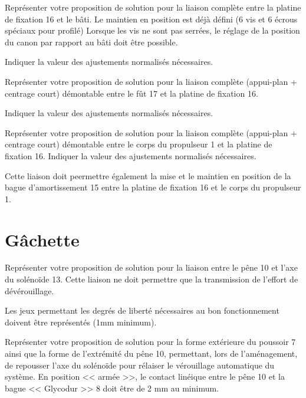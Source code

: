 \documentclass[11pt]{article}
\begin{document}
\UPSTIquestion Représenter votre proposition de solution pour la liaison complète entre la platine de fixation 16 et le bâti. Le maintien en position est déjà défini (6 vis et 6 écrous spéciaux pour profilé) Lorsque les vis ne sont pas serrées, le réglage de la position du canon par rapport au bâti doit être possible.

Indiquer la valeur des ajustements normalisés nécessaires.
\begin{UPSTIcorrige}
\end{UPSTIcorrige}

\UPSTIquestion Représenter votre proposition de solution pour la liaison complète (appui-plan + centrage court) démontable entre le fût 17 et la platine de fixation 16. 

Indiquer la valeur des ajustements normalisés nécessaires.
\begin{UPSTIcorrige}
\end{UPSTIcorrige}

\UPSTIquestion Représenter votre proposition de solution pour la liaison complète (appui-plan + centrage court) démontable entre le corps du propulseur 1 et la platine de fixation 16. Indiquer la valeur des ajustements normalisés nécessaires.

Cette liaison doit peermettre également la mise et le maintien en position de la bague d'amortissement 15 entre la platine de fixation 16 et le corps du propulseur 1. 

\begin{UPSTIcorrige}
\end{UPSTIcorrige}

\section{Gâchette}

\UPSTIquestion* Représenter votre proposition de solution pour la liaison entre le pêne 10 et l'axe du solénoïde 13. Cette liaison ne doit permettre que la transmission de l'effort de dévérouillage. 

Les jeux permettant les degrés de liberté nécessaires au bon fonctionnement doivent être représentés (1mm minimum). 
\begin{UPSTIcorrige}
\end{UPSTIcorrige}

\UPSTIquestion Représenter votre proposition de solution pour la forme extérieure du poussoir 7 ainsi que la forme de l'extrémité du pêne 10, permettant, lors de l'aménagement, de repousser l'axe du solénoïde pour rélaiser le vérouillage automatique du système. En position << armée >>, le contact linéique entre le pêne 10 et la bague << Glycodur >> 8 doit être de 2 mm au minimum.
\begin{UPSTIcorrige}
\end{UPSTIcorrige}
\end{document}
